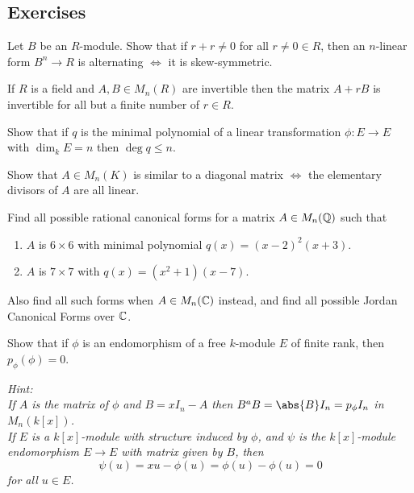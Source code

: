 \subsection{Exercises}

\begin{problem}[Hungerford 7.3.1]
\label{prob:1.1}
Let $B$ be an $R$-module. Show that if $r+r\neq 0$ for all $r\neq 0 \in R$, then an $n$-linear form $B^n\to R$ is alternating $\iff$ it is skew-symmetric.
\end{problem}

\begin{problem}[Hungerford 7.3.5]
\label{prob:1.1}
If $R$ is a field and $A, B \in M_n(R)$ are invertible then the matrix $A + rB$ is invertible for all but a finite number of $r\in R$.
\end{problem}

\begin{problem}[Hungerford 7.4.4]
\label{prob:1.1}
Show that if $q$ is the minimal polynomial of a linear transformation $\phi: E\to E$ with $\dim_k E = n$ then $\deg q \leq n$.
\end{problem}

\begin{problem}[Hungerford 7.4.8]
\label{prob:1.1}
Show that $A\in M_n(K)$ is similar to a diagonal matrix $\iff$ the elementary divisors of $A$ are all linear.
\end{problem}

\begin{problem}[Hungerford 7.4.10]
\label{prob:1.1}
Find all possible rational canonical forms for a matrix $A\in M_n(\Bbb Q)$ such that 

\begin{enumerate}
    \item $A$ is $6\times 6$ with minimal polynomial $q(x) = (x-2)^2(x+3)$.
    \item $A$ is $7\times 7$ with $q(x) = (x^2+1)(x-7)$.
\end{enumerate}

Also find all such forms when $A \in M_n(\Bbb C)$ instead, and find all possible Jordan Canonical Forms over $\Bbb C$.
\end{problem}

\begin{problem}[Hungerford 7.5.2]
\label{prob:1.1}
Show that if $\phi$ is an endomorphism of a free $k$-module $E$ of finite rank, then $p_\phi(\phi) = 0$.

\textit{
Hint: \\
If $A$ is the matrix of $\phi$ and $B = x I_n - A$ then $B^a B = \abs{B} I_n = p_\phi I_n$ in $M_n(k[x])$. \\
If $E$ is a $k[x]$-module with structure induced by $\phi$, and $\psi$ is the $k[x]$-module endomorphism $E\to E$ with matrix given by $B$, then $$\psi(u) = x u -\phi(u) = \phi(u) - \phi(u) = 0$$ for all $u\in E$.
}
\end{problem}

